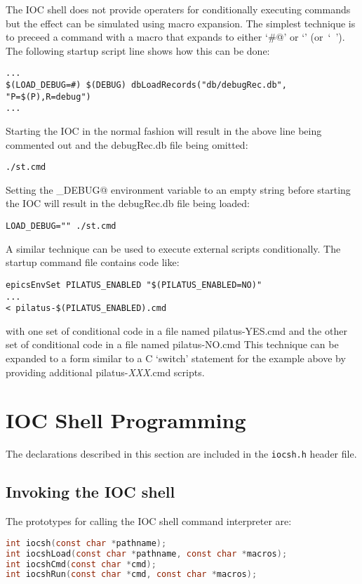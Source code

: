 The IOC shell does not provide operaters for conditionally executing commands
but the effect can be simulated using macro expansion.  The simplest
technique is to preceed a command with a macro that expands to either `\verb@#@' or `' (or~`~').
The following startup script line shows how this can be done:
\begin{verbatim}
...
$(LOAD_DEBUG=#) $(DEBUG) dbLoadRecords("db/debugRec.db", "P=$(P),R=debug")
...
\end{verbatim}
Starting the IOC in the normal fashion will result in the above line being
commented out and the debugRec.db file being omitted:
\begin{verbatim}
./st.cmd
\end{verbatim}
Setting the \verb@LOAD_DEBUG@ environment variable to an empty string before
starting the IOC will result in the debugRec.db file being loaded:
\begin{verbatim}
LOAD_DEBUG="" ./st.cmd
\end{verbatim}

A similar technique can be used to execute external scripts conditionally.
The startup command file contains code like:
\begin{verbatim}
epicsEnvSet PILATUS_ENABLED "$(PILATUS_ENABLED=NO)"
...
< pilatus-$(PILATUS_ENABLED).cmd
\end{verbatim}
with one set of conditional code in a file named pilatus-YES.cmd and
the other set of conditional code in a file named pilatus-NO.cmd
This technique can be expanded to a form similar to a C `switch' statement
for the example above by providing additional pilatus-{\it XXX}.cmd scripts.


\section{IOC Shell Programming}

The declarations described in this section are included in the \verb|iocsh.h| header file.

\subsection{Invoking the IOC shell}

The prototypes for calling the IOC shell command interpreter are:

\begin{lstlisting}[language=C]
int iocsh(const char *pathname);
int iocshLoad(const char *pathname, const char *macros);
int iocshCmd(const char *cmd);
int iocshRun(const char *cmd, const char *macros);
\end{lstlisting}

